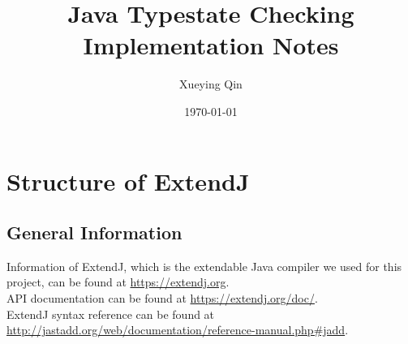 \documentclass[]{article}
\begin{document}
%




\title{Java Typestate Checking Implementation Notes}
\author{Xueying Qin}
\date{\small\today}

\maketitle

\section{Structure of ExtendJ}
\subsection{General Information}
Information of ExtendJ, which is the extendable Java compiler we used for this project, can be found at \url{https://extendj.org}. \\[0.2cm]
API documentation can be found at \url{https://extendj.org/doc/}.\\[0.2cm]
ExtendJ syntax reference can be found at \url{http://jastadd.org/web/documentation/reference-manual.php#jadd}.
\end{document}
